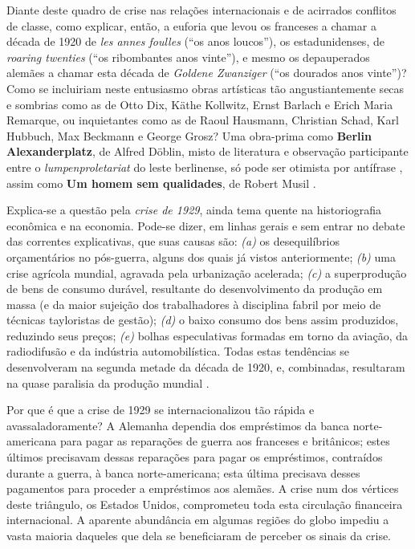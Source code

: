 Diante deste quadro de crise nas relações internacionais e de acirrados conflitos de classe, como explicar, então, a euforia que levou os franceses a chamar a década de 1920 de \textit{les annes foulles} (``os anos loucos''), os estadunidenses, de \textit{roaring twenties} (``os ribombantes anos vinte''), e mesmo os depauperados alemães a chamar esta década de \textit{Goldene Zwanziger} (``os dourados anos vinte'')? Como se incluiriam neste entusiasmo obras artísticas tão angustiantemente secas e sombrias como as de Otto Dix, Käthe Kollwitz, Ernst Barlach e Erich Maria Remarque, ou inquietantes como as de Raoul Hausmann, Christian Schad, Karl Hubbuch, Max Beckmann e George Grosz? Uma obra-prima como \textbf{Berlin Alexanderplatz}, de Alfred Döblin, misto de literatura e observação participante entre o \textit{lumpenproletariat} do leste berlinense, só pode ser otimista por antífrase \cite{doblin_alexanderplatz_2009}, assim como \textbf{Um homem sem qualidades}, de Robert Musil \cite{musil_quali_1989}.

Explica-se a questão pela \textit{crise de 1929}, ainda tema quente na historiografia econômica e na economia. Pode-se dizer, em linhas gerais e sem entrar no debate das correntes explicativas, que suas causas são: \textit{(a)} os desequilíbrios orçamentários no pós-guerra, alguns dos quais já vistos anteriormente; \textit{(b)} uma crise agrícola mundial, agravada pela urbanização acelerada; \textit{(c)} a superprodução de bens de consumo durável, resultante do desenvolvimento da produção em massa (e da maior sujeição dos trabalhadores à disciplina fabril por meio de técnicas tayloristas de gestão); \textit{(d)} o baixo consumo dos bens assim produzidos, reduzindo seus preços; \textit{(e)} bolhas especulativas formadas em torno da aviação, da radiodifusão e da indústria automobilística. Todas estas tendências se desenvolveram na segunda metade da década de 1920, e, combinadas, resultaram na quase paralisia da produção mundial \cite{gazier_1929_2009,hautcoeur_1929_2009}.

Por que é que a crise de 1929 se internacionalizou tão rápida e avassaladoramente? A Alemanha dependia dos empréstimos da banca norte-americana para pagar as reparações de guerra aos franceses e britânicos; estes últimos precisavam dessas reparações para pagar os empréstimos, contraídos durante a guerra, à banca norte-americana; esta última precisava desses pagamentos para proceder a empréstimos aos alemães. A crise num dos vértices deste triângulo, os Estados Unidos, comprometeu toda esta circulação financeira internacional. A aparente abundância em algumas regiões do globo impediu a vasta maioria daqueles que dela se beneficiaram de perceber os sinais da crise.

